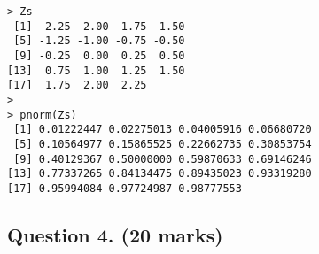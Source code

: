 \begin{framed}
\begin{verbatim}
> Zs
 [1] -2.25 -2.00 -1.75 -1.50
 [5] -1.25 -1.00 -0.75 -0.50
 [9] -0.25  0.00  0.25  0.50
[13]  0.75  1.00  1.25  1.50
[17]  1.75  2.00  2.25
>
> pnorm(Zs)
 [1] 0.01222447 0.02275013 0.04005916 0.06680720
 [5] 0.10564977 0.15865525 0.22662735 0.30853754
 [9] 0.40129367 0.50000000 0.59870633 0.69146246
[13] 0.77337265 0.84134475 0.89435023 0.93319280
[17] 0.95994084 0.97724987 0.98777553
\end{verbatim}
\end{framed}
\newpage
\subsection*{Question 4. (20 marks) }


